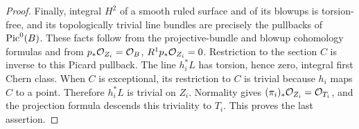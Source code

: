 \begin{proof}
Finally, integral $H^2$ of a smooth ruled surface and of its blowups is torsion-free, and its topologically trivial line bundles are precisely the pullbacks of $\operatorname{Pic}^0(B)$. These facts follow from the projective-bundle and blowup cohomology formulas and from $p_*\mathcal O_{Z_i}=\mathcal O_B$, $R^1p_*\mathcal O_{Z_i}=0$. Restriction to the section $C$ is inverse to this Picard pullback. The line $h_i^*L$ has torsion, hence zero, integral first Chern class. When $C$ is exceptional, its restriction to $C$ is trivial because $h_i$ maps $C$ to a point. Therefore $h_i^*L$ is trivial on $Z_i$. Normality gives $(\pi_i)_*\mathcal O_{Z_i}=\mathcal O_{T_i}$, and the projection formula descends this triviality to $T_i$. This proves the last assertion.
\end{proof}




